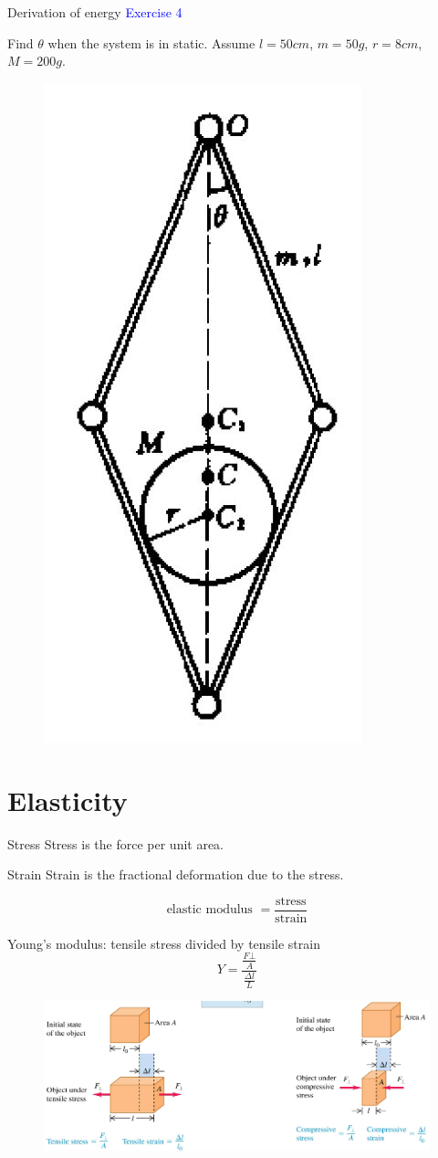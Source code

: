 \documentclass{beamer}
\begin{document}
\begin{frame}{Derivation of energy}
\textcolor{blue}{Exercise 4}

Find $\theta$ when the system is in static. Assume $l = 50cm$, $m = 50g$, $r = 8cm$, $M = 200g$.
\begin{figure}[htbp]
\centering
\includegraphics[width=0.2 \linewidth, angle =0]{ex4.png}
\label{fig:4}
\end{figure}
\end{frame}

\section{Elasticity}
\begin{frame}
  \begin{block}{Stress}
    Stress is the force per unit area.
  \end{block}\pause
  \begin{block}{Strain}
    Strain is the fractional deformation due to the stress.
  \end{block}\pause
  $$\text{elastic modulus } = \frac{\text{stress}}{\text{strain}}$$
\end{frame}

\begin{frame}
  \begin{block}{Young's modulus: tensile stress divided by tensile strain}
    $$Y = \frac{\frac{F\bot }{A}}{\frac{\Delta l}{L}}$$
  \end{block}\pause
  \begin{figure}[htbp]
  \centering
  \includegraphics[width=1 \linewidth, angle =0]{y's.png}
  \label{fig:y's}
  \end{figure}
\end{frame}
\end{document}
